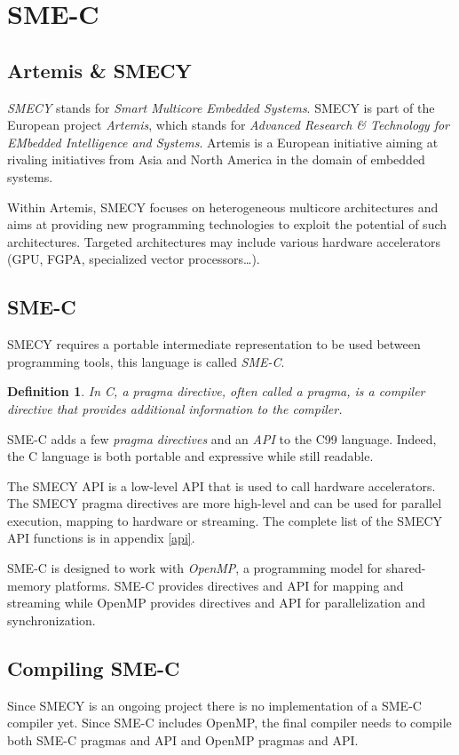 \documentclass [A4]{article}
\newtheorem{defdef}{Definition}
\begin{document}
\section{SME-C}
	\subsection{Artemis \& SMECY}
 	\emph{SMECY} stands for \emph{Smart Multicore Embedded Systems}. SMECY is part of the European project \emph{Artemis}, which stands for \emph{Advanced Research \& Technology for EMbedded Intelligence and Systems}. Artemis is a European initiative aiming at rivaling initiatives from Asia and North America in the domain of embedded systems.
	
	Within Artemis, SMECY focuses on heterogeneous multicore architectures and aims at providing new programming technologies to exploit the potential of such architectures. Targeted architectures may include various hardware accelerators (GPU, FGPA, specialized vector processors\ldots).

	\subsection{SME-C}
	SMECY requires a portable intermediate representation to be used between programming tools, this language is called \emph{SME-C}.
	
	\begin{defdef} In C, a \emph{pragma directive}, often called a \emph{pragma}, is a compiler directive that provides additional information to the compiler.
	\end{defdef}
	
	SME-C adds a few \emph{pragma directives} and an \emph{API} to the C99 language. Indeed, the C language is both portable and expressive while still readable.
	
	The SMECY API is a low-level API that is used to call hardware accelerators. The SMECY pragma directives are more high-level and can be used for parallel execution, mapping to hardware or streaming. The complete list of the SMECY API functions is in appendix \ref{api}.
	
	SME-C is designed to work with \emph{OpenMP}, a programming model for shared-memory platforms. SME-C provides directives and API for mapping and streaming while OpenMP provides directives and API for parallelization and synchronization.
	
	\subsection{Compiling SME-C}
	Since SMECY is an ongoing project there is no implementation of a SME-C compiler yet. Since SME-C includes OpenMP, the final compiler needs to compile both SME-C pragmas and API and OpenMP pragmas and API.
	
\end{document}
